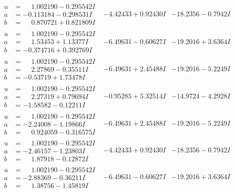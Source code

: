\documentclass[1p]{elsarticle_modified}
\theoremstyle{definition}
\begin{document}
$$\begin{array}{c|c|c}
\begin{aligned}
u &= \phantom{-}1.002190 - 0.295542 I \\
a &= -0.113184 - 0.298531 I \\
b &= \phantom{-}0.870721 + 0.821809 I\end{aligned}
 & -4.42433 + 0.92430 I & -18.2356 - 0.7942 I \\ \hline\begin{aligned}
u &= \phantom{-}1.002190 - 0.295542 I \\
a &= \phantom{-}1.53453 + 1.13377 I \\
b &= -0.374716 + 0.392769 I\end{aligned}
 & -6.49631 - 0.60627 I & -19.2016 + 3.6364 I \\ \hline\begin{aligned}
u &= \phantom{-}1.002190 - 0.295542 I \\
a &= \phantom{-}2.27869 - 0.35511 I \\
b &= -0.53719 + 1.73478 I\end{aligned}
 & -6.49631 + 2.45488 I & -19.2016 - 5.2249 I \\ \hline\begin{aligned}
u &= \phantom{-}1.002190 - 0.295542 I \\
a &= \phantom{-}2.27319 + 0.79694 I \\
b &= -1.58582 - 0.12211 I\end{aligned}
 & -0.95285 + 5.32514 I & -14.9724 - 4.2928 I \\ \hline\begin{aligned}
u &= \phantom{-}1.002190 - 0.295542 I \\
a &= -2.24008 - 1.19866 I \\
b &= \phantom{-}0.924059 - 0.316575 I\end{aligned}
 & -6.49631 + 2.45488 I & -19.2016 - 5.2249 I \\ \hline\begin{aligned}
u &= \phantom{-}1.002190 - 0.295542 I \\
a &= -2.46157 - 1.23803 I \\
b &= \phantom{-}1.87918 - 0.12872 I\end{aligned}
 & -4.42433 + 0.92430 I & -18.2356 - 0.7942 I \\ \hline\begin{aligned}
u &= \phantom{-}1.002190 - 0.295542 I \\
a &= -2.88369 - 0.36211 I \\
b &= \phantom{-}1.38756 - 1.45819 I\end{aligned}
 & -6.49631 - 0.60627 I & -19.2016 + 3.6364 I \\ \hline\begin{aligned}

\end{aligned}
\end{array}$$
\end{document}
